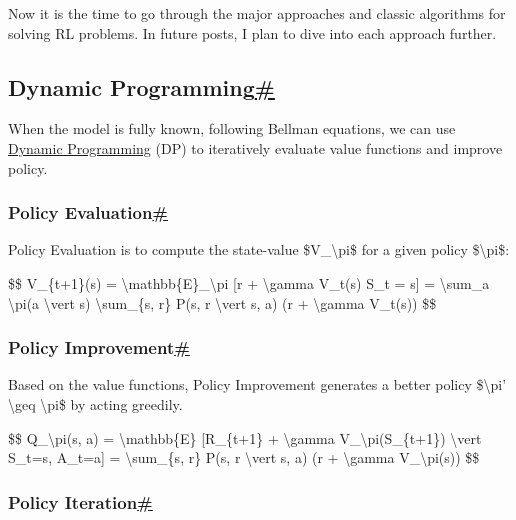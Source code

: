 Now it is the time to go through the major approaches and classic algorithms for solving RL problems. In future posts, I plan to dive into each approach further.

\subsection{\texorpdfstring{Dynamic Programming\hyperref[dynamic-programming]{\#}}{Dynamic Programming\#}}\label{dynamic-programming}

When the model is fully known, following Bellman equations, we can use \href{https://en.wikipedia.org/wiki/Dynamic_programming}{Dynamic Programming} (DP) to iteratively evaluate value functions and improve policy.

\subsubsection{\texorpdfstring{Policy Evaluation\hyperref[policy-evaluation]{\#}}{Policy Evaluation\#}}\label{policy-evaluation}

Policy Evaluation is to compute the state-value \$V\_\textbackslash pi\$ for a given policy \$\textbackslash pi\$:

\$\$ V\_\{t+1\}(s) = \textbackslash mathbb\{E\}\_\textbackslash pi {[}r + \textbackslash gamma V\_t(s\textquotesingle) \textbar{} S\_t = s{]} = \textbackslash sum\_a \textbackslash pi(a \textbackslash vert s) \textbackslash sum\_\{s\textquotesingle, r\} P(s\textquotesingle, r \textbackslash vert s, a) (r + \textbackslash gamma V\_t(s\textquotesingle)) \$\$

\subsubsection{\texorpdfstring{Policy Improvement\hyperref[policy-improvement]{\#}}{Policy Improvement\#}}\label{policy-improvement}

Based on the value functions, Policy Improvement generates a better policy \$\textbackslash pi' \textbackslash geq \textbackslash pi\$ by acting greedily.

\$\$ Q\_\textbackslash pi(s, a) = \textbackslash mathbb\{E\} {[}R\_\{t+1\} + \textbackslash gamma V\_\textbackslash pi(S\_\{t+1\}) \textbackslash vert S\_t=s, A\_t=a{]} = \textbackslash sum\_\{s\textquotesingle, r\} P(s\textquotesingle, r \textbackslash vert s, a) (r + \textbackslash gamma V\_\textbackslash pi(s\textquotesingle)) \$\$

\subsubsection{\texorpdfstring{Policy Iteration\hyperref[policy-iteration]{\#}}{Policy Iteration\#}}\label{policy-iteration}

